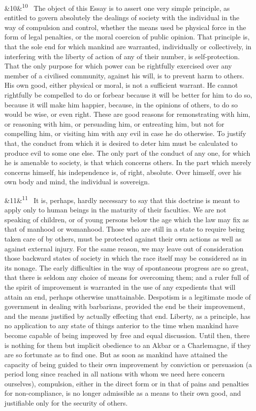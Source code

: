 \documentclass[12pt]{article}
\newcommand{\para}[1][]{\par\noindent\ifx&#1&\else\textsuperscript{\footnotesize #1}~\fi}
\begin{document}
\para[10] The object of this Essay is to assert one very simple principle, as entitled to govern absolutely the dealings of society with the individual in the way of compulsion and control, whether the means used be physical force in the form of legal penalties, or the moral coercion of public opinion. That principle is, that the sole end for which mankind are warranted, individually or collectively, in interfering with the liberty of action of any of their number, is self-protection. That the only purpose for which power can be rightfully exercised over any member of a civilised community, against his will, is to prevent harm to others. His own good, either physical or moral, is not a sufficient warrant. He cannot rightfully be compelled to do or forbear because it will be better for him to do so, because it will make him happier, because, in the opinions of others, to do so would be wise, or even right. These are good reasons for remonstrating with him, or reasoning with him, or persuading him, or entreating him, but not for compelling him, or visiting him with any evil in case he do otherwise. To justify that, the conduct from which it is desired to deter him must be calculated to produce evil to some one else. The only part of the conduct of any one, for which he is amenable to society, is that which concerns others. In the part which merely concerns himself, his independence is, of right, absolute. Over himself, over his own body and mind, the individual is sovereign.

\para[11] It is, perhaps, hardly necessary to say that this doctrine is meant to apply only to human beings in the maturity of their faculties. We are not speaking of children, or of young persons below the age which the law may fix as that of manhood or womanhood. Those who are still in a state to require being taken care of by others, must be protected against their own actions as well as against external injury. For the same reason, we may leave out of consideration those backward states of society in which the race itself may be considered as in its nonage. The early difficulties in the way of spontaneous progress are so great, that there is seldom any choice of means for overcoming them; and a ruler full of the spirit of improvement is warranted in the use of any expedients that will attain an end, perhaps otherwise unattainable. Despotism is a legitimate mode of government in dealing with barbarians, provided the end be their improvement, and the means justified by actually effecting that end. Liberty, as a principle, has no application to any state of things anterior to the time when mankind have become capable of being improved by free and equal discussion. Until then, there is nothing for them but implicit obedience to an Akbar or a Charlemagne, if they are so fortunate as to find one. But as soon as mankind have attained the capacity of being guided to their own improvement by conviction or persuasion (a period long since reached in all nations with whom we need here concern ourselves), compulsion, either in the direct form or in that of pains and penalties for non-compliance, is no longer admissible as a means to their own good, and justifiable only for the security of others.
\end{document}
